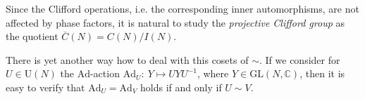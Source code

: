 \documentclass[10pt]{amsart}
\theoremstyle{plain}
\theoremstyle{definition}
\theoremstyle{remark}%
\newcommand{\C}{\mathbb{C}}
\newcommand{\GL}{\mathrm{GL}}
\newcommand{\Ad}{\mathrm{Ad}}
\newcommand{\U}{\mathrm{U}}
\begin{document}
Since the Clifford operations, i.e. the corresponding inner automorphisms, 
are not affected by phase factors, it is natural to study the 
\emph{projective Clifford group} as the quotient
$ \overline{C}(N) =  C(N)/ I(N)$.

There is yet another way how to deal with this cosets of $\sim$. If we consider for $U\in \U(N)$  the $\Ad$-action 
$ \Ad_U : \ Y \mapsto UYU^{-1}$, where $Y\in \GL(N,\C)$, then it is easy to verify that $\Ad_U =\Ad_V $ holds if and only if $U\sim V$.

% 

\end{document}
